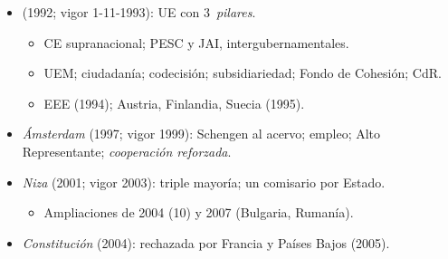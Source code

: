 \documentclass{article}
\begin{document}
\begin{columnas}
\begin{itemize}
\item {} (1992; vigor 1-11-1993): UE con 3~\emph{pilares}.
  \begin{itemize}
  \item CE supranacional; PESC y JAI, intergubernamentales.
  \item UEM; ciudadanía; codecisión; subsidiariedad; Fondo de Cohesión; CdR.
  \item EEE (1994); Austria, Finlandia, Suecia (1995).
  \end{itemize}
\item \emph{Ámsterdam} (1997; vigor 1999): Schengen al acervo; empleo; Alto Representante; \emph{cooperación reforzada}.
\item \emph{Niza} (2001; vigor 2003): triple mayoría; un comisario por Estado.
  \begin{itemize}
  \item Ampliaciones de 2004 (10) y 2007 (Bulgaria, Rumanía).
  \end{itemize}
\item \emph{Constitución} (2004): rechazada por Francia y Países Bajos (2005).
\end{itemize}


\end{columnas}
\end{document}
